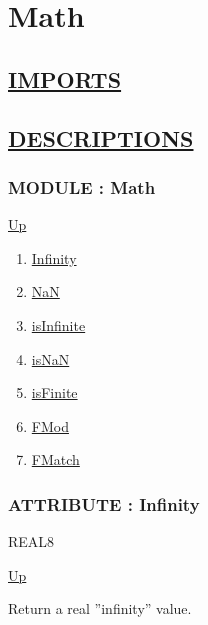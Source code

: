 \chapter*{Math}
\hypertarget{ecldoc:toc:Math}{}

\section*{\underline{IMPORTS}}

\section*{\underline{DESCRIPTIONS}}
\subsection*{MODULE : Math}
\hypertarget{ecldoc:Math}{}
\par
\begin{minipage}[t]{\textwidth}
\begin{flushleft}
  
\end{flushleft}
\end{minipage}
\hyperlink{ecldoc:toc:root}{Up} \\
\par
\par
\begin{enumerate}
\item \hyperlink{ecldoc:math.infinity}{Infinity}
\item \hyperlink{ecldoc:math.nan}{NaN}
\item \hyperlink{ecldoc:math.isinfinite}{isInfinite}
\item \hyperlink{ecldoc:math.isnan}{isNaN}
\item \hyperlink{ecldoc:math.isfinite}{isFinite}
\item \hyperlink{ecldoc:math.fmod}{FMod}
\item \hyperlink{ecldoc:math.fmatch}{FMatch}
\end{enumerate}
\subsection*{ATTRIBUTE : Infinity}
\hypertarget{ecldoc:math.infinity}{}
\par
\begin{minipage}[t]{\textwidth}
\begin{flushleft}
REAL8  
\end{flushleft}
\end{minipage}
\hyperlink{ecldoc:Math}{Up} \\
\par
Return a real ''infinity'' value. \\
\par
